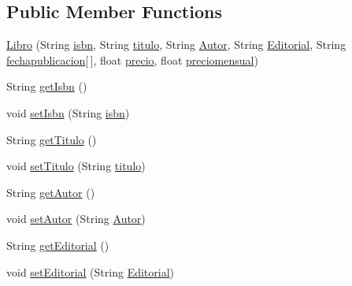 \subsection*{Public Member Functions}
\begin{DoxyCompactItemize}
\item 
\mbox{\hyperlink{classlibreria_1_1_libro_aebec824403e4537753ea3b24f5854587}{Libro}} (String \mbox{\hyperlink{classlibreria_1_1_libro_a855939c41be35682aad6b6c08962dde3}{isbn}}, String \mbox{\hyperlink{classlibreria_1_1_libro_aa45a435366afb4759f59f6f4d86d0e3a}{titulo}}, String \mbox{\hyperlink{classlibreria_1_1_libro_aa5040773b6ae3f4b9538418a4499ba9c}{Autor}}, String \mbox{\hyperlink{classlibreria_1_1_libro_a0e45b510f79de7f6aaa678f4cf060b45}{Editorial}}, String \mbox{\hyperlink{classlibreria_1_1_libro_a1feec01556c7a8ffe5963b544b7ebc58}{fechapublicacion}}\mbox{[}$\,$\mbox{]}, float \mbox{\hyperlink{classlibreria_1_1_libro_ab19a3f31d2aaab1bca6ba4f188951adc}{precio}}, float \mbox{\hyperlink{classlibreria_1_1_libro_aa3ecf9746a1de3547b71c154ffbcbeb7}{preciomensual}})
\item 
String \mbox{\hyperlink{classlibreria_1_1_libro_a79a31f66b8e3f247928931756199d107}{get\+Isbn}} ()
\item 
void \mbox{\hyperlink{classlibreria_1_1_libro_ac9b15637f6aa44daa264bc9f7f9627cb}{set\+Isbn}} (String \mbox{\hyperlink{classlibreria_1_1_libro_a855939c41be35682aad6b6c08962dde3}{isbn}})
\item 
String \mbox{\hyperlink{classlibreria_1_1_libro_ac07542098ad57c5c5e1e608d4bf67ae8}{get\+Titulo}} ()
\item 
void \mbox{\hyperlink{classlibreria_1_1_libro_a698c25403141da07d2a4e5dc337d8419}{set\+Titulo}} (String \mbox{\hyperlink{classlibreria_1_1_libro_aa45a435366afb4759f59f6f4d86d0e3a}{titulo}})
\item 
String \mbox{\hyperlink{classlibreria_1_1_libro_a728146cad416bde473aa6e169f6accff}{get\+Autor}} ()
\item 
void \mbox{\hyperlink{classlibreria_1_1_libro_a0c49a8ce6e5ad49d281acaa5ad6eddbe}{set\+Autor}} (String \mbox{\hyperlink{classlibreria_1_1_libro_aa5040773b6ae3f4b9538418a4499ba9c}{Autor}})
\item 
String \mbox{\hyperlink{classlibreria_1_1_libro_a2c75d916c4636900590dc6ed9be19c13}{get\+Editorial}} ()
\item 
void \mbox{\hyperlink{classlibreria_1_1_libro_a4fbeb961016d6cd0bd63ff2b252010ee}{set\+Editorial}} (String \mbox{\hyperlink{classlibreria_1_1_libro_a0e45b510f79de7f6aaa678f4cf060b45}{Editorial}})

\end{DoxyCompactItemize}
